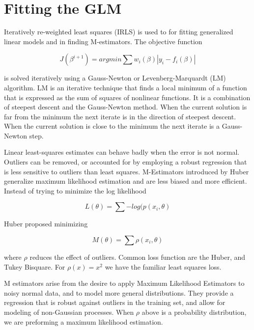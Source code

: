\section{Fitting the GLM}Iteratively re-weighted least squares (IRLS) is used to for fitting generalized linear models and in finding M-estimators.  The objective function

\begin{equation}
J(\beta^{i+1}) = arg min \sum w_i ( \beta) | y_i - f_i (\beta) |
\end{equation}

is solved iteratively using a Gauss-Newton or Levenberg-Marquardt (LM) algorithm. LM is an iterative technique that finds a local minimum of a function that is expressed as the sum of squares of nonlinear functions. It is a combination of steepest descent and the Gauss-Newton method. When the current solution is far from the minimum the next iterate is in the direction of steepest descent. When the current solution is close to the minimum the next iterate is a Gauss-Newton step.

Linear least-squares estimates can behave badly when the error is not normal.  Outliers can be removed, or accounted for by employing a robust regression that is less sensitive to outliers than least squares.  M-Estimators introduced by Huber generalize maximum likelihood estimation and are less biased and more efficient.  Instead of trying to minimize the log likelihood

\begin{equation}
L(\theta) = \sum - log ( p(x_i, \theta)
\end{equation}

Huber proposed minimizing

\begin{equation}
M(\theta) = \sum  \rho(x_i, \theta)
\end{equation}

where $\rho$ reduces the effect of outliers. Common loss function are the Huber, and Tukey Bisquare.  For $\rho(x) = x^2$ we have the familiar least squares loss.

M estimators arise from the desire to apply Maximum Likelihood Estimators to noisy normal data, and to model more general distributions. They provide a regression that is robust against outliers in the training set, and allow for modeling of non-Gaussian processes. When $\rho$ above is a probability distribution, we are preforming a maximum likelihood estimation.

